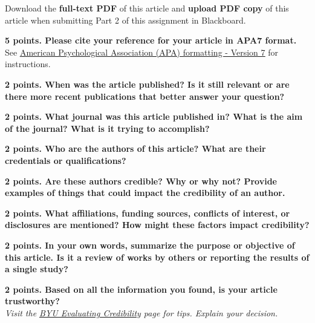 \documentclass[title={Credible Sources - Literature Review and Article Selection},points={30}]{fdsn201homework}
\let\oldhref\href
\renewcommand{\href}[2]{\oldhref{#1}{\underline{#2}}}
\begin{document}
\begin{problems}
	Download the \textbf{full-text PDF} of this article and \textbf{upload PDF copy} of this article when submitting Part 2 of this assignment in Blackboard.%
	\item \textbf{5 points. Please cite your reference for your article in APA7 format.}\\
	See \href{https://apastyle.apa.org/style-grammar-guidelines/references}{American Psychological Association (APA) formatting - Version 7} for instructions.%
	\item \textbf{2 points. When was the article published?
	Is it still relevant or are there more recent publications that better answer your question?}
	\item \textbf{2 points. What journal was this article published in?
	What is the aim of the journal?
	What is it trying to accomplish?}%
	\item \textbf{2 points. Who are the authors of this article?
	What are their credentials or qualifications?}
	\item \textbf{2 points. Are these authors credible?
	Why or why not?
	Provide examples of things that could impact the credibility of an author.}
	\item \textbf{2 points. What affiliations, funding sources, conflicts of interest, or disclosures are mentioned?
	How might these factors impact credibility?}
	\item \textbf{2 points. In your own words, summarize the purpose or objective of this article.
	Is it a review of works by others or reporting the results of a single study?}
	\item \textbf{2 points. Based on all the information you found, is your article trustworthy?}\\
	\emph{Visit the \href{https://guides.lib.byu.edu/c.php?g=216340&p=1428399}{BYU Evaluating Credibility} page for tips.
	Explain your decision.}
\end{problems}

\let\href\oldhref
\end{document}
